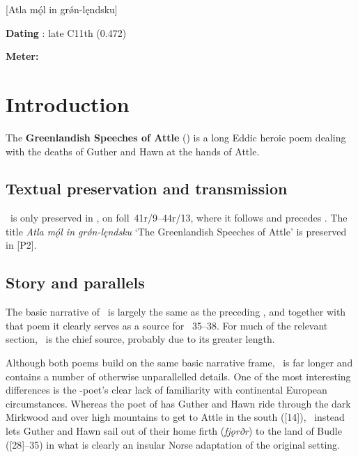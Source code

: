 [Atla mǫ́l in grǿn-lęndsku]

\begin{flushright}%
\textbf{Dating} \parencite{Sapp2022}: late C11th (0.472)

\textbf{Meter:} \Malahattr
\end{flushright}%

\section{Introduction}

The \textbf{Greenlandish Speeches of Attle} (\Atlamal) is a long Eddic heroic poem dealing with the deaths of Guther and Hawn at the hands of Attle.

\subsection{Textual preservation and transmission}

\Atlamal\ is only preserved in \Regius, on foll~41r/9--44r/13, where it follows  and precedes .  The title \emph{Atla mǫ́l in grǿn-lęndsku} ‘The Greenlandish Speeches of Attle’ is preserved in [P2].

\subsection{Story and parallels}

The basic narrative of \Atlamal\ is largely the same as the preceding , and together with that poem it clearly serves as a source for \VolsungaSaga\ 35--38.  For much of the relevant section, \Atlamal\ is the chief source, probably due to its greater length.

Although both poems build on the same basic narrative frame, \Atlamal\ is far longer and contains a number of otherwise unparallelled details.
One of the most interesting differences is the \Atlamal-poet’s clear lack of familiarity with continental European circumstances.  Whereas the poet of  has Guther and Hawn ride through the dark Mirkwood and over high mountains to get to Attle in the south ([14]), \Atlamal\ instead lets Guther and Hawn sail out of their home firth (\emph{fjǫrðr}) to the land of Budle ([28]--35) in what is clearly an insular Norse adaptation of the original setting.

